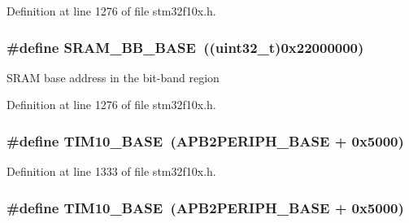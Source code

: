 Definition at line 1276 of file stm32f10x.\+h.

\subsubsection[{\texorpdfstring{S\+R\+A\+M\+\_\+\+B\+B\+\_\+\+B\+A\+SE}{SRAM_BB_BASE}}]{\setlength{\rightskip}{0pt plus 5cm}\#define S\+R\+A\+M\+\_\+\+B\+B\+\_\+\+B\+A\+SE~(({\bf uint32\+\_\+t})0x22000000)}\hypertarget{group___peripheral__memory__map_gad3548b6e2f017f39d399358f3ac98454}{}\label{group___peripheral__memory__map_gad3548b6e2f017f39d399358f3ac98454}
S\+R\+AM base address in the bit-\/band region 

Definition at line 1276 of file stm32f10x.\+h.

\subsubsection[{\texorpdfstring{T\+I\+M10\+\_\+\+B\+A\+SE}{TIM10_BASE}}]{\setlength{\rightskip}{0pt plus 5cm}\#define T\+I\+M10\+\_\+\+B\+A\+SE~({\bf A\+P\+B2\+P\+E\+R\+I\+P\+H\+\_\+\+B\+A\+SE} + 0x5000)}\hypertarget{group___peripheral__memory__map_ga3eff32f3801db31fb4b61d5618cad54a}{}\label{group___peripheral__memory__map_ga3eff32f3801db31fb4b61d5618cad54a}


Definition at line 1333 of file stm32f10x.\+h.

\subsubsection[{\texorpdfstring{T\+I\+M10\+\_\+\+B\+A\+SE}{TIM10_BASE}}]{\setlength{\rightskip}{0pt plus 5cm}\#define T\+I\+M10\+\_\+\+B\+A\+SE~({\bf A\+P\+B2\+P\+E\+R\+I\+P\+H\+\_\+\+B\+A\+SE} + 0x5000)}\hypertarget{group___peripheral__memory__map_ga3eff32f3801db31fb4b61d5618cad54a}{}\label{group___peripheral__memory__map_ga3eff32f3801db31fb4b61d5618cad54a}


